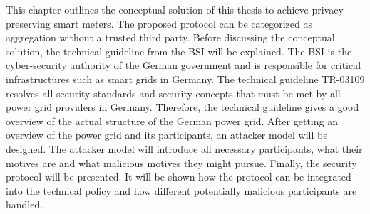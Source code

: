 This chapter outlines the conceptual solution of this thesis to achieve privacy-preserving smart meters. The proposed protocol can be categorized as aggregation without a trusted third party. Before discussing the conceptual solution, the technical guideline from the BSI will be explained. The BSI is the cyber-security authority of the German government and is responsible for critical infrastructures such as smart grids in Germany.  The technical guideline TR-03109 resolves all security standards and security concepts that must be met by all power grid providers in Germany. Therefore, the technical guideline gives a good overview of the actual structure of the German power grid. After getting an overview of the power grid and its participants, an attacker model will be designed. The attacker model will introduce all necessary participants, what their motives are and what malicious motives they might pursue. Finally, the security protocol will be presented. It will be shown how the protocol can be integrated into the technical policy and how different potentially malicious participants are handled.

